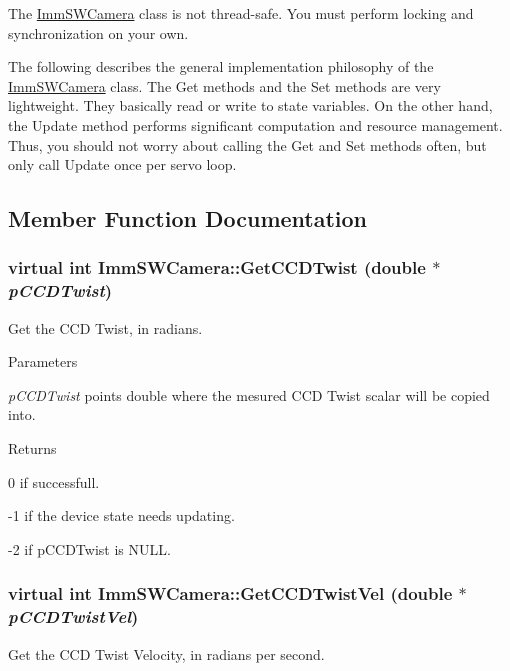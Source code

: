 The \hyperlink{classImmSWCamera}{ImmSWCamera} class is not thread-\/safe. You must perform locking and synchronization on your own.

The following describes the general implementation philosophy of the \hyperlink{classImmSWCamera}{ImmSWCamera} class. The Get methods and the Set methods are very lightweight. They basically read or write to state variables. On the other hand, the Update method performs significant computation and resource management. Thus, you should not worry about calling the Get and Set methods often, but only call Update once per servo loop. 

\subsection{Member Function Documentation}
\hypertarget{classImmSWCamera_a0f65ede1aa1c3ef569b5efefa5e2e2df}{
\subsubsection[{GetCCDTwist}]{\setlength{\rightskip}{0pt plus 5cm}virtual int ImmSWCamera::GetCCDTwist (double $\ast$ {\em pCCDTwist})}}
\label{classImmSWCamera_a0f65ede1aa1c3ef569b5efefa5e2e2df}
Get the CCD Twist, in radians.


\begin{DoxyParams}{Parameters}
\item[{\em pCCDTwist}]points double where the mesured CCD Twist scalar will be copied into.\end{DoxyParams}
\begin{DoxyReturn}{Returns}

\end{DoxyReturn}
0 if successfull.

-\/1 if the device state needs updating.

-\/2 if pCCDTwist is NULL. \hypertarget{classImmSWCamera_ab198ad2477023e7576491561a5dfa6eb}{
\subsubsection[{GetCCDTwistVel}]{\setlength{\rightskip}{0pt plus 5cm}virtual int ImmSWCamera::GetCCDTwistVel (double $\ast$ {\em pCCDTwistVel})}}
\label{classImmSWCamera_ab198ad2477023e7576491561a5dfa6eb}
Get the CCD Twist Velocity, in radians per second.


